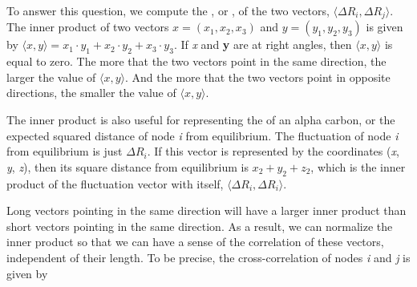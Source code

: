 To answer this question, we compute the , or , of the two vectors, $ \langle \Delta R_i, \Delta R_j \rangle $. The inner product of two vectors $x = (x_1, x_2, x_3)$ and $y = (y_1, y_2, y_3)$ is given by $ \langle x, y \rangle = x_1 \cdot y_1 + x_2 \cdot y_2 + x_3 \cdot y_3$. If \textit{x} and \textbf{y} are at right angles, then $ \langle \textit{x}, \textit{y} \rangle $ is equal to zero. The more that the two vectors point in the same direction, the larger the value of $\langle \textit{x}, \textit{y} \rangle $. And the more that the two vectors point in opposite directions, the smaller the value of $\langle \textit{x}, \textit{y} \rangle $.\\

\begin{qbox}[%
	Say that $x = (1, -2, 3)$,$y = (2, -3, 5)$, and  $z = (-1, 3, -4)$. Compute the inner products $\langle x, y \rangle$ and $\langle x, z \rangle$  and ensure that your answers match the preceding observation.
	]\end{qbox}

The inner product is also useful for representing  the  of an alpha carbon, or the expected squared distance of node \textit{i} from equilibrium. The fluctuation of node \textit{i} from equilibrium is just $\Delta R_i$. If this vector is represented by the coordinates (\textit{x}, \textit{y}, \textit{z}), then its square distance from equilibrium is $x_2 + y_2 + z_2$, which is the inner product of the fluctuation vector with itself, $ \langle \Delta R_i, \Delta R_i \rangle $.\\

\begin{note}\end{note}

Long vectors pointing in the same direction will have a larger inner product than short vectors pointing in the same direction. As a result, we can normalize the inner product so that we can have a sense of the correlation of these vectors, independent of their length. To be precise, the cross-correlation of nodes \textit{i} and \textit{j} is given by

